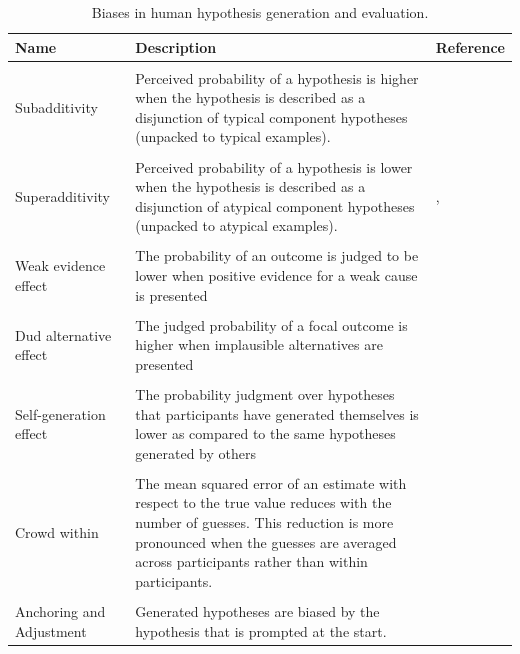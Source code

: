 \begin{table}[htbp]
\centering
\caption{Biases in human hypothesis generation and evaluation.}
\label{tab:biases}
\begin{tabular}{p{}>{\raggedright}p{}p{}}
\hline
\textbf{Name}&\textbf{Description}& \textbf{Reference}\\\hline\\
Subadditivity& Perceived probability of a hypothesis is higher when the hypothesis is described as a disjunction of typical component hypotheses (unpacked to typical examples). & \cite{fox1998belief} \\\\
Superadditivity& Perceived probability of a hypothesis is lower when the hypothesis is described as a disjunction of atypical component hypotheses (unpacked to atypical examples). & \cite{super}, \cite{hadjichristidis1999opening} \\\\
Weak evidence effect& The probability of an outcome is judged to be lower when positive evidence for a weak cause is presented & \cite{weak}\\\\
Dud alternative effect & The judged probability of a focal outcome is higher when implausible alternatives are presented & \cite{dud}\\\\
Self-generation effect & The probability judgment over hypotheses that participants have generated themselves is lower as compared to the same hypotheses generated by others& \cite{koriat1980,conf} \\\\
Crowd within & The mean squared error of an estimate with respect to the true value reduces with the number of guesses. This reduction is more pronounced when the guesses are averaged across participants rather than within participants. & \cite{vul08}
\\\\
Anchoring and Adjustment & Generated hypotheses are biased by the hypothesis that is prompted at the start. & \cite{tversky} \\
\end{tabular}
\end{table}

